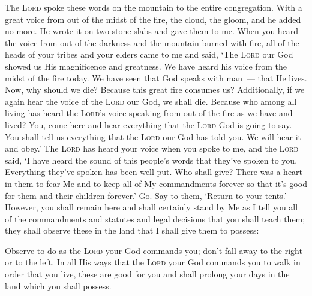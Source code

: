 \begin{inparaenum}
   The \textsc{Lord} spoke these words on the mountain to the entire congregation. With a great voice from out of the midst of the fire, the cloud, the gloom, and he added no more. He wrote it on two stone slabs and gave them to me.%
   When you heard the voice from out of the darkness and the mountain burned with fire, all of the heads of your tribes and your elders came to me%
   and said, `The \textsc{Lord} our God showed us His magnificence and greatness. We have heard his voice from the midst of the fire today. We have seen that God speaks with man~--- that He lives.%
   Now, why should we die? Because this great fire consumes us? Additionally, if we again hear the voice of the \textsc{Lord} our God, we shall die.%
   Because who among all living has heard the \textsc{Lord}'s voice speaking from out of the fire as we have and lived?%
   You, come here and hear everything that the \textsc{Lord} God is going to say. You shall tell us everything that the \textsc{Lord} our God has told you. We will hear it and obey.'%
   The \textsc{Lord} has heard your voice when you spoke to me, and the \textsc{Lord} said, `I have heard the sound of this people's words that they've spoken to you. Everything they've spoken has been well put.%
   Who shall give? There was a heart in them to fear Me and to keep all of My commandments forever so that it's good for them and their children forever.'%
   Go. Say to them, `Return to your tents.'%
   However, you shall remain here and shall certainly stand by Me as I tell you all of the commandments and statutes and legal decisions that you shall teach them; they shall observe these in the land that I shall give them to possess:%
\end{inparaenum}
\begin{enumerate}
  \setcounter{enumi}{31}
   Observe to do as the \textsc{Lord} your God commands you; don't fall away to the right or to the left.%
   In all His ways that the \textsc{Lord} your God commands you to walk in order that you live, these are good for you and shall prolong your days in the land which you shall possess.%
\end{enumerate}
